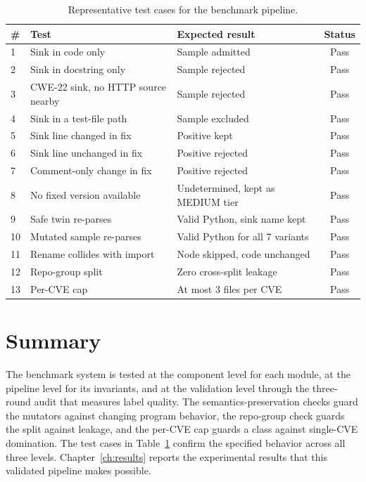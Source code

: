 \begin{table}[htb]
\caption{Representative test cases for the benchmark pipeline.}
\label{tab:testcases}
\centering
\begin{tabularx}{\textwidth}{p{0.5cm} X X c}
\toprule
\textbf{\#} & \textbf{Test} & \textbf{Expected result} & \textbf{Status} \\
\midrule
1 & Sink in code only & Sample admitted & Pass \\
2 & Sink in docstring only & Sample rejected & Pass \\
3 & CWE-22 sink, no HTTP source nearby & Sample rejected & Pass \\
4 & Sink in a test-file path & Sample excluded & Pass \\
5 & Sink line changed in fix & Positive kept & Pass \\
6 & Sink line unchanged in fix & Positive rejected & Pass \\
7 & Comment-only change in fix & Positive rejected & Pass \\
8 & No fixed version available & Undetermined, kept as MEDIUM tier & Pass \\
9 & Safe twin re-parses & Valid Python, sink name kept & Pass \\
10 & Mutated sample re-parses & Valid Python for all 7 variants & Pass \\
11 & Rename collides with import & Node skipped, code unchanged & Pass \\
12 & Repo-group split & Zero cross-split leakage & Pass \\
13 & Per-CVE cap & At most 3 files per CVE & Pass \\
\bottomrule
\end{tabularx}
\end{table}

\section{Summary}

The benchmark system is tested at the component level for each module, at the
pipeline level for its invariants, and at the validation level through the
three-round audit that measures label quality. The semantics-preservation checks
guard the mutators against changing program behavior, the repo-group check guards
the split against leakage, and the per-CVE cap guards a class against single-CVE
domination. The test cases in Table~\ref{tab:testcases} confirm the specified
behavior across all three levels. Chapter~\ref{ch:results} reports the
experimental results that this validated pipeline makes possible.
